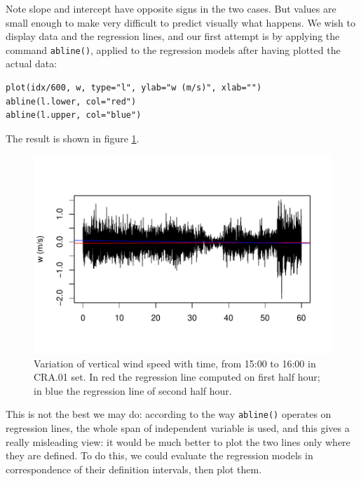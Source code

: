 \documentclass[a4paper,10pt]{book}
\begin{document}
Note slope and intercept have opposite signs in the two cases. But values are small enough to make very difficult to predict visually what happens. We wish to display data and the regression lines, and our first attempt is by applying the command \verb|abline()|, applied to the regression models after having plotted the actual data:

\begin{verbatim}
plot(idx/600, w, type="l", ylab="w (m/s)", xlab="")
abline(l.lower, col="red")
abline(l.upper, col="blue")
\end{verbatim}

\noindent The result is shown in figure \ref{fig:Simple plot 3}.

\begin{figure}[htp]
 \centering
 \begin{center}
 \includegraphics[scale=1.1,keepaspectratio=true]{./diagrams/SimplePlot3.pdf}
 \end{center}
 \caption{Variation of vertical wind speed with time, from 15:00 to 16:00 in CRA.01 set. In red the regression line computed on first half hour; in blue the regression line of second half hour.}
 \label{fig:Simple plot 3}
\end{figure}

This is not the best we may do: according to the way \verb|abline()| operates on regression lines, the whole span of independent variable is used, and this gives a really misleading view: it would be much better to plot the two lines only where they are defined. To do this, we could evaluate the regression models in correspondence of their definition intervals, then plot them.
\end{document}
